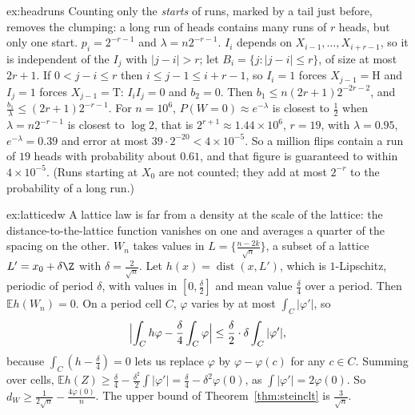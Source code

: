 \begin{solution}{ex:headruns}
\idea Counting only the \emph{starts} of runs, marked by a tail just before, removes the clumping: a long run of heads contains many runs of $r$ heads, but only
one start.
\writeup $p_i=2^{-r-1}$ and $\lambda=n2^{-r-1}$. $I_i$ depends on $X_{i-1},\dots,X_{i+r-1}$, so it is independent of the $I_j$ with $|j-i|>r$; let $B_i=\{j:|j-i|\le r\}$,
of size at most $2r+1$. If $0<j-i\le r$ then $i\le j-1\le i+r-1$, so $I_i=1$ forces $X_{j-1}=\mathrm H$ and $I_j=1$ forces $X_{j-1}=\mathrm T$: $I_iI_j=0$ and $b_2=0$.
Then $b_1\le n(2r+1)2^{-2r-2}$, and $\frac{b_1}\lambda\le(2r+1)2^{-r-1}$. For $n=10^6$, $P(W=0)\approx e^{-\lambda}$ is closest to $\frac12$ when $\lambda=n2^{-r-1}$ is
closest to $\log2$, that is $2^{r+1}\approx1.44\times10^6$, $r=19$, with $\lambda=0.95$, $e^{-\lambda}=0.39$ and error at most $39\cdot2^{-20}<4\times10^{-5}$.
So a million flips contain a run of $19$ heads with probability about $0.61$, and that figure is guaranteed to within $4\times10^{-5}$.
(Runs starting at $X_0$ are not counted; they add at most $2^{-r}$ to the probability of a long run.)
\end{solution}

\begin{solution}{ex:latticedw}
\idea A lattice law is far from a density at the scale of the lattice: the distance-to-the-lattice function vanishes on one and averages a quarter of the
spacing on the other.
\writeup $W_n$ takes values in $L=\{\frac{n-2k}{\sqrt n}\}$, a subset of a lattice $L'=x_0+\delta\Z$ with $\delta=\frac2{\sqrt n}$. Let $h(x)=\operatorname{dist}(x,L')$, which is
$1$-Lipschitz, periodic of period $\delta$, with values in $[0,\frac\delta2]$ and mean value $\frac\delta4$ over a period. Then $\mathbb Eh(W_n)=0$. On a period cell
$C$, $\varphi$ varies by at most $\int_C|\varphi'|$, so
\[
\Bigl|\int_Ch\varphi-\frac\delta4\int_C\varphi\Bigr|\le\frac\delta2\cdot\delta\int_C|\varphi'| ,
\]
because $\int_C(h-\frac\delta4)=0$ lets us replace $\varphi$ by $\varphi-\varphi(c)$ for any $c\in C$. Summing over cells, $\mathbb Eh(Z)\ge\frac\delta4-\frac{\delta^2}2\int|\varphi'|=\frac\delta4-\delta^2\varphi(0)$,
as $\int|\varphi'|=2\varphi(0)$. So $d_W\ge\frac1{2\sqrt n}-\frac{4\varphi(0)}n$. The upper bound of Theorem~\ref{thm:steinclt} is $\frac3{\sqrt n}$.
\end{solution}

